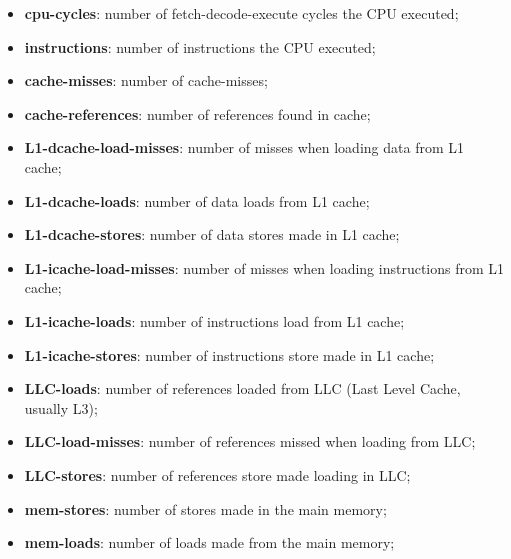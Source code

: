 \begin{itemize}
	\item \textbf{cpu-cycles}: number of fetch-decode-execute cycles the CPU executed;
	\item \textbf{instructions}: number of instructions the CPU executed;
	\item \textbf{cache-misses}: number of cache-misses;
	\item \textbf{cache-references}: number of references found in cache;
	\item \textbf{L1-dcache-load-misses}: number of misses when loading data from L1 cache;
	\item \textbf{L1-dcache-loads}: number of data loads from L1 cache;
	\item \textbf{L1-dcache-stores}: number of data stores made in L1 cache;
	\item \textbf{L1-icache-load-misses}: number of misses when loading instructions from L1 cache;
	\item \textbf{L1-icache-loads}: number of instructions load from L1 cache;
	\item \textbf{L1-icache-stores}: number of instructions store made in L1 cache;
	\item \textbf{LLC-loads}: number of references loaded from LLC (Last Level Cache, usually L3);
	\item \textbf{LLC-load-misses}: number of references missed when loading from LLC;
	\item \textbf{LLC-stores}: number of references store made loading in LLC;
	\item \textbf{mem-stores}: number of stores made in the main memory;
	\item \textbf{mem-loads}: number of loads made from the main memory;
\end{itemize}
